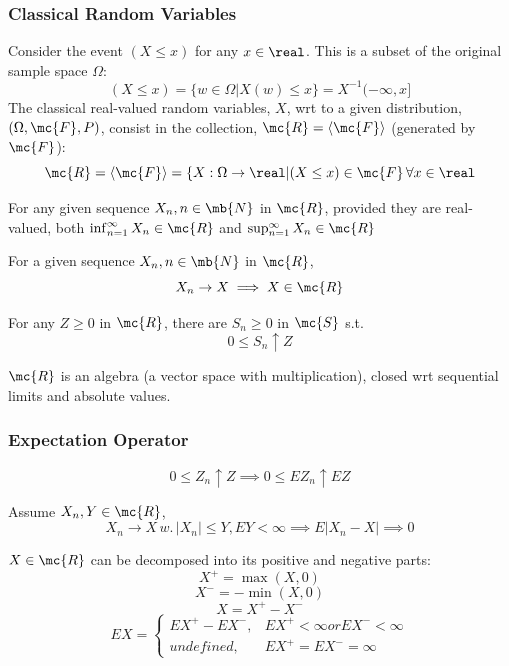 \documentclass[11pt]{article}
\numberwithin{equation}{section}
\begin{document}
\subsubsection{Classical Random Variables}
Consider the event $(X \leq x)$ for any $x \in \real$. This is a subset of the original sample space $\Omega$:
$$(X \leq x) = \{w \in \Omega | X(w) \leq x\} = X^{-1}(-\infty, x]$$
The classical real-valued random variables, $X$, wrt to a given distribution, $(\Omega, \mc{F}, P)$, consist in the collection, $\mc{R} = \langle \mc{F} \rangle$ (generated by $\mc{F}$):
\begin{equation}
	\mc{R} = \langle \mc{F} \rangle = \{X: \Omega \rightarrow \real | (X \leq x)\in \mc{F} \, \forall x \in \real
\end{equation}

For any given sequence $X_n, n \in \mb{N}$ in $\mc{R}$, provided they are real-valued, both $\inf_{n=1}^\infty X_n \in \mc{R}$ and $\sup_{n=1}^\infty X_n \in \mc{R}$

For a given sequence $X_n, n\in \mb{N}$ in $\mc{R}$,
$$X_n \rightarrow X \implies X \in \mc{R}$$

For any $Z \geq 0$ in $\mc{R}$, there are $S_n \geq 0$ in $\mc{S}$ s.t. 
$$0 \leq S_n \uparrow Z$$

\proposition
$\mc{R}$ is an algebra (a vector space with multiplication), closed wrt sequential limits and absolute values.

\subsubsection{Expectation Operator}
\begin{equation}
	0 \leq Z_n \uparrow Z \implies 0 \leq EZ_n \uparrow EZ
\end{equation}

Assume $X_n, Y \in \mc{R}$,
\begin{equation}
	X_n \rightarrow X \, w.\, |X_n| \leq Y, EY < \infty \implies E|X_n - X| \implies 0
\end{equation}

\property[decomposition]
$X \in \mc{R}$ can be decomposed into its positive and negative parts:
$$X^+ = \max(X, 0)$$
$$X^- = -\min(X, 0)$$
$$X = X^+ - X^-$$
\begin{equation}
	EX = \begin{cases}
		EX^+ - EX^-, &EX^+ < \infty or EX^- < \infty \\
		undefined, &EX^+ = EX^-  = \infty
	\end{cases}
\end{equation}
\end{document}
